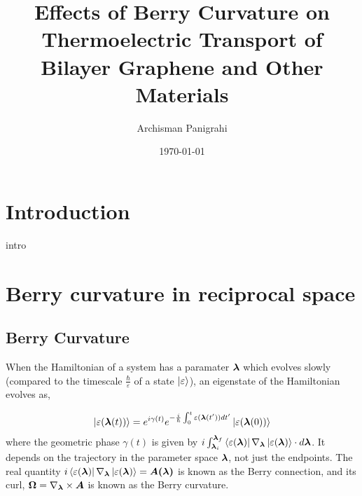 \documentclass[aps,amsmath,prl]{revtex4-2}
\renewcommand\vec[1]{\ensuremath\boldsymbol{#1}} %
\begin{document}
\title{\bf Effects of Berry Curvature on Thermoelectric Transport of Bilayer Graphene and Other Materials}


\author{Archisman Panigrahi}



\date{\today}

\begin{abstract}

\end{abstract}

\maketitle

\onecolumngrid



\section{Introduction}
intro
\section{Berry curvature in reciprocal space}
\subsection{Berry Curvature}
When the Hamiltonian of a system has a paramater $\vec{\lambda}$ which evolves slowly (compared to the timescale $\frac{\hbar}{\varepsilon}$ of a state $\ket{\varepsilon}$), an eigenstate of the Hamiltonian evolves as,\cite{BerryQuantalPhase1984}

\begin{equation}
	\ket{\varepsilon(\vec{\lambda}(t))} = e^{i \gamma(t)} e^{-\frac{i}{\hbar} \int_0^t \varepsilon(\vec{\lambda}(t')) dt'} \ket{\varepsilon(\vec{\lambda}(0))}
\end{equation}
where the geometric phase $\gamma(t)$ is given by $i\int_{\vec{\lambda}_i}^{\vec{\lambda}_f} \bra{\varepsilon({\vec{\lambda}})}\nabla_{\vec{\lambda}} \ket{\varepsilon({\vec{\lambda}})} \cdot d \vec{\lambda}$. It depends on the trajectory in the parameter space $\vec{\lambda}$, not just the endpoints. The real quantity $i\bra{\varepsilon({\vec{\lambda}})}\nabla_{\vec{\lambda}}\ket{\varepsilon({\vec{\lambda}})} = \vec{A(\vec{\lambda})}$ is known as the Berry connection, and its curl, $\vec{\Omega} = \nabla_{\vec{\lambda}} \times \vec{A}$ is known as the Berry curvature.
\end{document}
